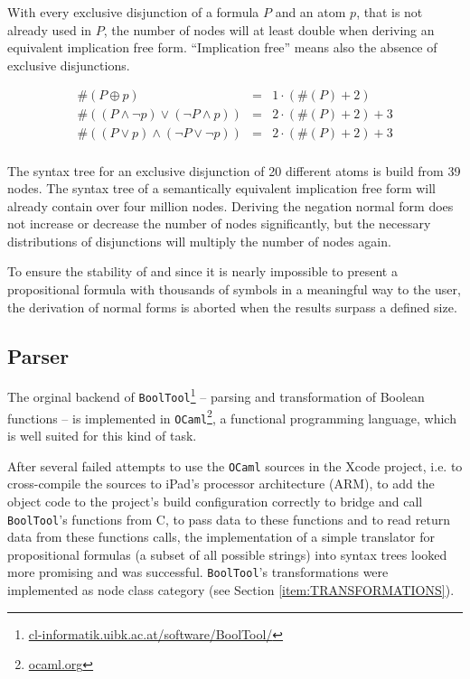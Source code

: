 With every exclusive disjunction of a formula $P$ and an atom $p$, 
that is not already used in $P$,
the number of nodes will at least double 
when deriving an equivalent implication free form.
“Implication free” means also the absence of exclusive disjunctions. %

\begin{eqnarray*}
\#(P \oplus p) & = & 1 \cdot(\#(P) + 2) \\
\#((P \wedge \neg p) \vee  (\neg P \wedge p)) & = & 2 \cdot (\#(P) + 2) + 3 \\
\#((P \vee p) \wedge  (\neg P \vee \neg p)) & = & 2 \cdot (\#(P) + 2) + 3 \\
\end{eqnarray*}

The syntax tree for an exclusive disjunction of 20 different atoms is build from 39 nodes.
The syntax tree of a semantically equivalent implication free form will already contain over four million nodes.
Deriving the negation normal form does not increase or decrease the number of nodes significantly,
but the necessary distributions of disjunctions will multiply the number of nodes again.

To ensure the stability of \Nyaya 
and since it is nearly impossible 
to present a propositional formula 
with thousands of symbols 
in a meaningful way
to the user, 
the derivation of normal forms is aborted when the results surpass a defined size.



\subsection{Parser}
\label{sec:Parser}

The orginal backend of \verb+BoolTool+\footnote{
\href{http://cl-informatik.uibk.ac.at/software/BoolTool/}{cl-informatik.uibk.ac.at/software/BoolTool/}} 
– parsing and transformation of Boolean functions – 
is implemented in \verb+OCaml+\footnote{
\href{http://ocaml.org}{ocaml.org}}, 
a functional programming language, which is well suited for this kind of task.

After several failed attempts to use the \verb+OCaml+ sources in the Xcode project, 
i.e. to cross-compile the sources to iPad's processor architecture (ARM),
to add the object code to the project's build configuration correctly 
to bridge and call \verb+BoolTool+'s functions from C, 
to pass data to these functions and to read return data from these functions calls,
the implementation of a simple translator 
for propositional formulas (a subset of all possible strings)
into syntax trees looked more promising and was successful. 
\verb=BoolTool='s transformations were implemented as node class category (see Section \vref{item:TRANSFORMATIONS}).

